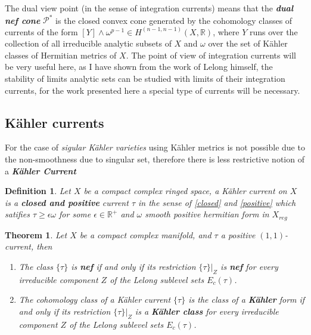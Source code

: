 \documentclass[12pt,twoside,a4paper]{report}
\newtheorem{definition}{Definition}[section]
\newtheorem{theorem}{Theorem}[section]
\newcommand{\re}{\ensuremath{\mathbb R }}
\begin{document}
  The dual view point (in the sense of integration currents) means that the \emph{\bf dual nef cone} $\mathcal{P}^*$ is the closed convex cone generated by the cohomology classes of currents of the form $[Y]\wedge\omega^{p-1}\in H^{(n-1,n-1)}(X,\re)$, where $Y$  runs over the collection of all irreducible analytic subsets of $X$ and $\omega$ over the set of Kähler classes of Hermitian metrics of $X$. The point of view of integration currents will be very useful here, as I have shown from the work of Lelong himself, the stability of limits analytic sets can be studied with limits of their integration currents, for the work presented here a special type of currents will be necessary.

\subsection{Kähler currents}
\noindent For the case of \emph{sigular Kähler varieties} using Kähler metrics is not possible due to the non-smoothness due to singular set, therefore there is less restrictive notion of a \emph{\bf Kähler Current}
\begin{definition}
Let $X$ be a compact complex ringed space, a Kähler current on $X$ is a {\bf closed and positive} current $\tau$ in the sense of \ref{closed} and \ref{positive} which satifies $\tau\geq\epsilon\omega$ for some $\epsilon\in\re^{+}$ and $\omega$ smooth positive hermitian form in $X_{reg}$ 
\end{definition}

\begin{theorem}
    Let $X$ be a compact complex manifold, and $\tau$ a positive $(1,1)$-current, then
    \begin{enumerate}
      \item The class $\{\tau\}$ is {\bf nef} if and only if its restriction $\{\tau\}|_Z$ is {\bf nef} for every irreducible component $Z$ of the Lelong sublevel sets $E_c(\tau)$.
      \item The cohomology class of a Kähler current $\{\tau\}$ is the class of a {\bf Kähler} form if and only if its restriction $\{\tau\}|_Z$ is a {\bf Kähler class} for every irreducible component $Z$ of the Lelong sublevel sets $E_c(\tau)$.
    \end{enumerate}
\end{theorem}
\end{document}
